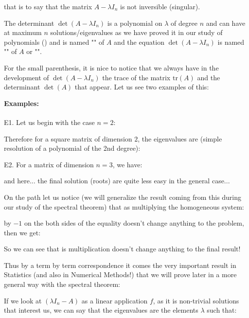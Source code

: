 	that is to say that the matrix $A-\lambda I_n$ is not inversible (singular).
	
	The determinant $\det(A-\lambda I_n)$ is a polynomial on $\lambda$ of degree $n$ and can have at maximum $n$ solutions/eigenvalues as we have proved it in our study of polynomials () and is named "\label{characteristic polynomial determinant}" of $A$ and the equation $\det(A-\lambda I_n)$ is named "" of $A$ or "\label{eigenvalue equations}".
	
	For the small parenthesis, it is nice to notice that we always have in the development of $\det(A-\lambda I_n)$ the trace of the matrix $\text{tr}(A)$ and the determinant $\det (A)$ that appear. Let us see two examples of this:
	
	\pagebreak
	\begin{tcolorbox}[colframe=black,colback=white,sharp corners]
	\textbf{{\Large {}}Examples:}\\\\
	E1. Let us begin with the case $n=2$:
	
	Therefore for a square matrix of dimension $2$, the eigenvalues are (simple resolution of a polynomial of the 2nd degree):
	
	E2. For a matrix of dimension $n=3$, we have:
	
	and here... the final solution (roots) are quite less easy in the general case...
	\end{tcolorbox}
	On the path let us notice (we will generalize the result coming from this during our study of the spectral theorem) that as multiplying the homogeneous system:
	
	by $-1$ on the both sides of the equality doesn't change anything to the problem, then we get:
	
	So we can see that is multiplication doesn't change anything to the final result!
	
	Thus by a term by term correspondence it comes the very important result in Statistics (and also in Numerical Methods!) that we will prove later in a more general way with the spectral theorem:
	
	If we look at $(\lambda I_n-A)$ as a linear application $f$, as it is non-trivial solutions that interest us, we can say that the eigenvalues are the elements $\lambda$ such that:
	

